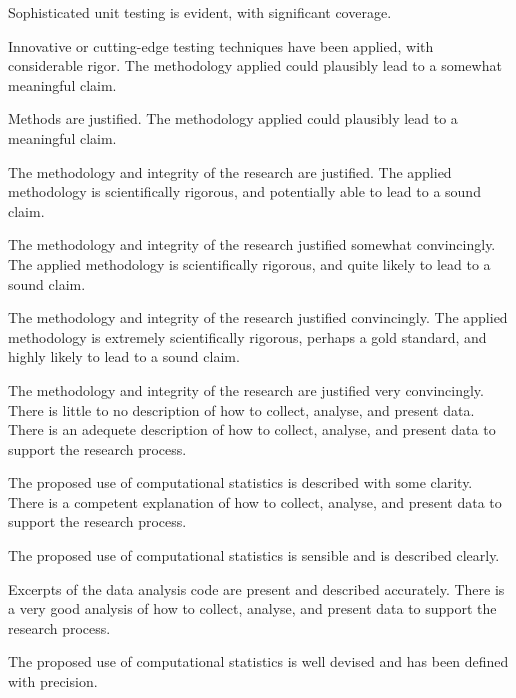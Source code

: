 \begin{markingrubric}
            \par Sophisticated unit testing is evident, with significant coverage.
            \par Innovative or cutting-edge testing techniques have been applied, with considerable rigor.
%
        \grade\fail 
        \grade 		The methodology applied could plausibly lead to a somewhat meaningful claim.
        \par		Methods are justified.
        \grade 		The methodology applied could plausibly lead to a meaningful claim.
        \par		The methodology and integrity of the research are justified.
        \grade 		The applied methodology is scientifically rigorous, and potentially able to lead to a sound claim.
        \par		The methodology and integrity of the research justified somewhat convincingly.
        \grade 		The applied methodology is scientifically rigorous, and quite likely to lead to a sound claim.
        \par		The methodology and integrity of the research justified convincingly.
        \grade 		The applied methodology is extremely scientifically rigorous, perhaps a gold standard, and highly likely to lead to a sound claim.
        \par		The methodology and integrity of the research are justified very convincingly.
%   
        \grade\fail 	There is little to no description of how to collect, analyse, and present data.
        \grade 		There is an adequete description of how to collect, analyse, and present data to support the research process.
         \par		The proposed use of computational statistics is described with some clarity.        
        \grade 		There is a competent explanation of how to collect, analyse, and present data to support the research process.
         \par		The proposed use of computational statistics is sensible and is described clearly.         
        \par		Excerpts of the data analysis code are present and described accurately.                 
        \grade 		There is a very good analysis of how to collect, analyse, and present data to support the research process.
         \par		The proposed use of computational statistics is well devised and has been defined with precision.                  

\end{markingrubric}
